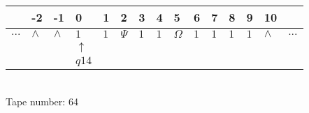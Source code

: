 \documentclass{article}
\begin{document}
\begin{table}[H]
\centering
\begin{tabular}{lllllllllllllll}
 & -2 & -1 & 0 & 1 & 2 & 3 & 4 & 5 & 6 & 7 & 8 & 9 & 10 & \\
\hline
$...$ & \multicolumn{1}{|l|}{$\wedge$} & \multicolumn{1}{|l|}{$\wedge$} & \multicolumn{1}{|l|}{$1$} & \multicolumn{1}{|l|}{$1$} & \multicolumn{1}{|l|}{$\Psi$} & \multicolumn{1}{|l|}{$1$} & \multicolumn{1}{|l|}{$1$} & \multicolumn{1}{|l|}{$\Omega$} & \multicolumn{1}{|l|}{$1$} & \multicolumn{1}{|l|}{$1$} & \multicolumn{1}{|l|}{$1$} & \multicolumn{1}{|l|}{$1$} & \multicolumn{1}{|l|}{$\wedge$} & $...$\\
\hline
&  &  & $\uparrow$ &  &  &  &  &  &  &  &  &  &  &  \\
&  &  & $ q14 $ &  &  &  &  &  &  &  &  &  &  &  \\
\end{tabular}
\\
Tape number: 64
\noindent\makebox[\linewidth]{\hdashrule{\textwidth}{1pt}{1pt}}\end{table}
\end{document}
